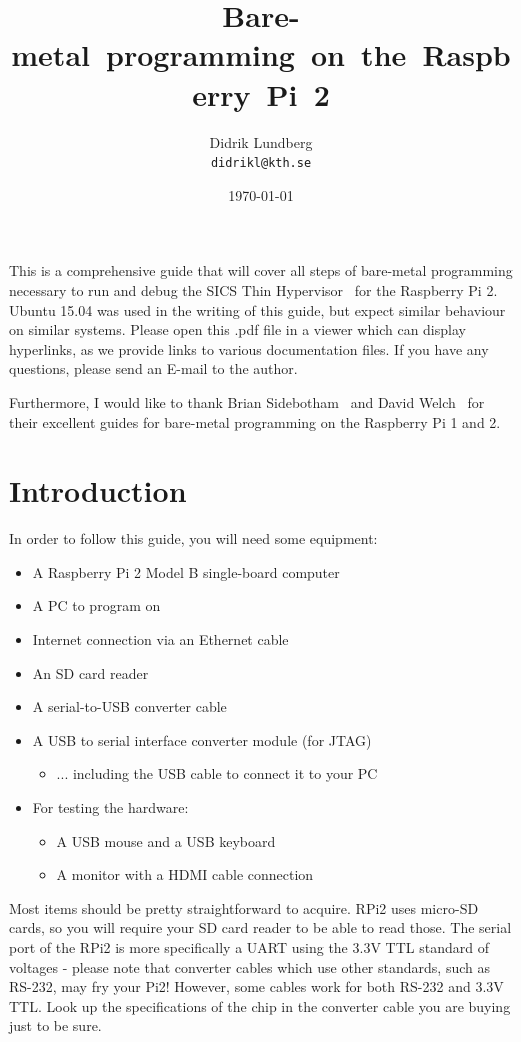 \documentclass[a4paper,11pt,reqno]{amsart}
\title{\mbox{Bare-metal programming on the Raspberry Pi 2}}
\author{Didrik Lundberg\\
\texttt{didrikl@kth.se}}
\date{\today}
\begin{document}
\maketitle
\noindent
This is a comprehensive guide that will cover all steps of bare-metal programming necessary to run and debug the SICS Thin Hypervisor~\cite{do14sth} for the Raspberry Pi 2. Ubuntu 15.04 was used in the writing of this guide, but expect similar behaviour on similar systems. Please open this .pdf file in a viewer which can display hyperlinks, as we provide links to various documentation files. If you have any questions, please send an E-mail to the author.

Furthermore, I would like to thank Brian Sidebotham~\cite{sidebotham14guide} and David Welch~\cite{welch14guide} for their excellent guides for bare-metal programming on the Raspberry Pi 1 and 2.
\section{Introduction}
In order to follow this guide, you will need some equipment:
\begin{itemize}
  \item A Raspberry Pi 2 Model B single-board computer
  \item A PC to program on
  \item Internet connection via an Ethernet cable
  \item An SD card reader
  \item A serial-to-USB converter cable
  \item A USB to serial interface converter module (for JTAG)
   \begin{itemize}
    \item ... including the USB cable to connect it to your PC
  \end{itemize}
  \item For testing the hardware:
  \begin{itemize}
    \item A USB mouse and a USB keyboard
    \item A monitor with a HDMI cable connection
  \end{itemize}
\end{itemize}
Most items should be pretty straightforward to acquire. RPi2 uses micro-SD cards, so you will require your SD card reader to be able to read those. The serial port of the RPi2 is more specifically a UART using the 3.3V TTL standard of voltages - please note that converter cables which use other standards, such as RS-232, may fry your Pi2! However, some cables work for both RS-232 and 3.3V TTL. Look up the specifications of the chip in the converter cable you are buying just to be sure.
\end{document}
